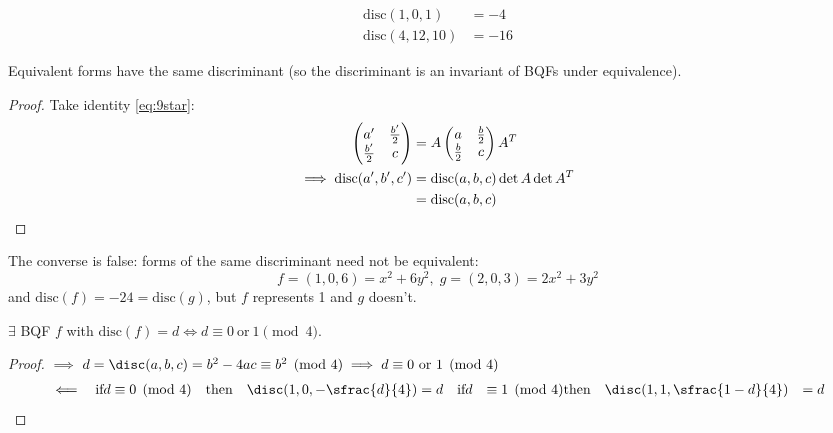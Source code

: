 \documentclass{article}
\begin{document}
\begin{eg}
    \begin{align*}
        \mathrm{disc}(1, 0, 1) &= -4 \\
        \mathrm{disc}(4, 12, 10) &= -16
    \end{align*}
\end{eg}

\begin{nlemma}\label{lem:4.2}
    Equivalent forms have the same discriminant (so the discriminant is an invariant of BQFs under equivalence).
\end{nlemma}

\begin{proof}
    Take identity \eqref{eq:9star}:
    \begin{align*}
        \begin{pmatrix} a' & \frac{b'}{2} \\ \frac{b'}{2} & c \end{pmatrix}
        &= A \begin{pmatrix} a & \frac{b}{2} \\ \frac{b}{2} & c \end{pmatrix}
        A^T \\
        \implies \mathrm{disc}(a', b', c') &= \mathrm{disc}(a, b, c) \det A \det A^T \\
                                           &= \mathrm{disc}(a, b, c) \qedhere
    \end{align*}
\end{proof}

\begin{remark}
    The converse is false: forms of the same discriminant need not be equivalent:
    \begin{equation*}
        f = (1, 0, 6) = x^2 + 6y^2, \; g = (2, 0, 3) = 2x^2 + 3y^2
    \end{equation*}
    and $\mathrm{disc}(f) = -24 = \mathrm{disc}(g)$, but $f$ represents 1 and $g$ doesn't.
\end{remark}

\begin{nlemma}\label{lem:4.3}
    $\exists$ BQF $f$ with $\mathrm{disc}(f) = d \iff d \equiv 0 \ \text{or}\ 1 \pmod{4}$.
\end{nlemma}
\begin{proof}
    $\implies$ $d = \disc(a, b, c) = b^2 - 4ac \equiv b^2 \pmod{4} \implies d \equiv 0 \text{ or } 1 \pmod{4}$ \\
    \begin{align*}
        \impliedby& & \text{if} d &\equiv 0 \pmod{4} & \text{then}& &\disc(1, 0, -\sfrac{d}{4}) &= d
                  & & \text{if} d &\equiv 1 \pmod{4} & \text{then}& &\disc(1, 1, \sfrac{1-d}{4}) &= d
    \end{align*}
\end{proof}
\end{document}
